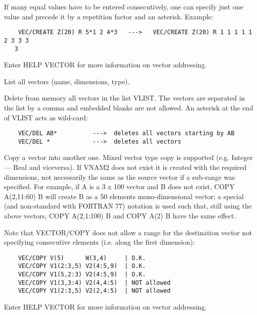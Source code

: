    \par
If many equal values have to be entered consecutively, one can specify just 
   one value and precede it by a repetition factor and an asterisk. Example:  
\begin{verbatim}
    VEC/CREATE Z(20) R 5*1 2 4*3   --->   VEC/CREATE Z(20) R 1 1 1 1 1 2 3 3 3 
   3
\end{verbatim}
   \par
Enter HELP VECTOR for more information on vector addressing.  

\ENDCMD


   \par
List all vectors (name, dimensions, type).  

\ENDCMD


\BEGARG
{}
\ENDARG

   \par
Delete from memory all vectors in the list VLIST.  The vectors are 
   separated in the list by a comma and embedded blanks are not allowed. An 
   asterisk at the end of VLIST acts as wild-card:  
\begin{verbatim}
    VEC/DEL AB*          --->  deletes all vectors starting by AB
    VEC/DEL *            --->  deletes all vectors
\end{verbatim}

\ENDCMD


\BEGARG
{}
\ENDARG

   \par
Copy a vector into another one.  Mixed vector type copy is supported (e.g. 
   Integer ---\KET{} Real and viceversa).  If VNAM2 does not exist it is 
   created with the required dimensions, not necessarily the same as the 
   source vector if a sub-range was specified.  For example, if A is a 3 x 100 
   vector and B does not exist, COPY A(2,11:60) B will create B as a 50 
   elements mono-dimensional vector; a special (and non-standard with FORTRAN 
   77) notation is used such that, still using the above vectors, COPY 
   A(2,1:100) B and COPY A(2) B have the same effect.  

   \par
Note that VECTOR/COPY does not allow a range for the destination vector not 
   specifying consecutive elements (i.e. along the first dimension):  
\begin{verbatim}
    VEC/COPY V(5)      W(3,4)     | O.K.
    VEC/COPY V1(2:3,5) V2(4:5,9)  | O.K.
    VEC/COPY V1(5,2:3) V2(4:5,9)  | O.K.
    VEC/COPY V1(3,3:4) V2(4,4:5)  | NOT allowed
    VEC/COPY V1(2:3,5) V2(2,4:5)  | NOT allowed
\end{verbatim}
   \par
Enter HELP VECTOR for more information on vector addressing.  

